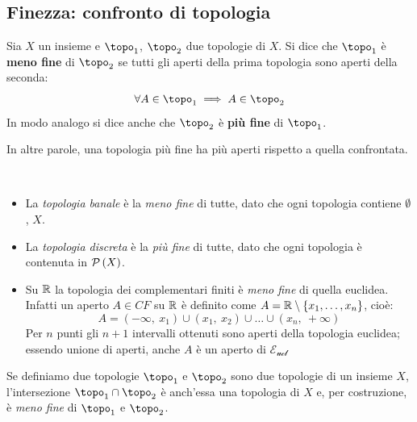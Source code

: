 \subsection{Finezza: confronto di topologia}
\begin{define}
	Sia $X$ un insieme e $\topo_1$, $\topo_2$ due topologie di $X$. Si dice che $\topo_1$ è \textbf{meno fine} di $\topo_2$ se tutti gli aperti della prima topologia sono aperti della seconda:
	\begin{equation}
		\forall A\in\topo_1\implies A\in \topo_2
	\end{equation}
	In modo analogo si dice anche che $\topo_2$ è \textbf{più fine} di $\topo_1$.
\end{define}
In altre parole, una topologia più fine ha più aperti rispetto a quella confrontata.
\begin{example}~{}
	\begin{itemize}
		\item La \textit{topologia banale} è la \textit{meno fine} di tutte, dato che ogni topologia contiene $\emptyset$, $X$.
		\item La \textit{topologia discreta} è la \textit{più fine} di tutte, dato che ogni topologia è contenuta in $\mathcal{P}\left(X\right)$.
		\item Su $\mathbb{R}$ la topologia dei complementari finiti è \textit{meno fine} di quella euclidea. Infatti un aperto $A\in CF$ su $\mathbb{R}$ è definito come $A=\mathbb{R}\setminus\left\{x_1,\ldots,x_n\right\}$, cioè:
		\begin{equation*}
			A=\left(-\infty,\ x_1\right)\cup\left(x_1,\ x_2\right)\cup\ldots\cup\left(x_n,\ +\infty\right)
		\end{equation*}
		Per $n$ punti gli $n+1$ intervalli ottenuti sono aperti della topologia euclidea; essendo unione di aperti, anche $A$ è un aperto di $\mathcal{E_{ucl}}$
	\end{itemize}
\end{example}
\begin{observe}\label{intersezionetopo}
	Se definiamo due topologie $\topo_1$ e $\topo_2$ sono due topologie di un insieme $X$, l'intersezione $\topo_1\cap\topo_2$ è anch'essa una topologia di $X$ e, per costruzione, è \textit{meno fine} di $\topo_1$ e $\topo_2$.
\end{observe}
